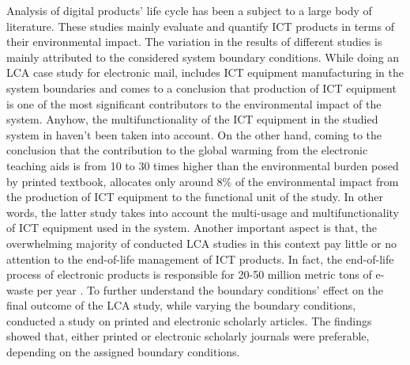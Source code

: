 \documentclass[conference]{IEEEtran}
\begin{document}
Analysis of digital products' life cycle has been a subject to a large body of literature. These studies mainly evaluate and quantify ICT products in terms of their environmental impact. The variation in the results of different studies is mainly attributed to the considered system boundary conditions. While doing an LCA case study for electronic mail, \cite{farrant2012environmental} includes ICT equipment manufacturing in the system boundaries and comes to a conclusion that production of ICT equipment is one of the most significant contributors to the environmental impact of the system. Anyhow, the multifunctionality of the ICT equipment in the studied system in \cite{farrant2012environmental} haven't been taken into account. On the other hand, coming to the conclusion that the contribution to the global warming from the electronic teaching aids is from 10 to 30 times higher than the environmental burden posed by printed textbook, \cite{enroth2009} allocates only around 8\% of the environmental impact from the production of ICT equipment to the functional unit of the study. In other words, the latter study takes into account the multi-usage and multifunctionality of ICT equipment used in the system.
Another important aspect is that, the overwhelming majority of conducted LCA studies in this context pay little or no attention to the end-of-life management of ICT products. In fact, the end-of-life process of electronic products is responsible for 20-50 million metric tons of e-waste per year \cite{koljonen2008environmental}. To further understand the boundary conditions' effect on the final outcome of the LCA study, \cite{gard2002digital} while varying the boundary conditions, conducted a study on printed and electronic scholarly articles. The findings showed that, either printed or electronic scholarly journals were preferable, depending on the assigned boundary conditions.
\end{document}
